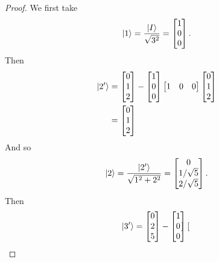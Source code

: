 \begin{proof}
We first take 
\begin{equation*}
    \ket{1} = \frac{\ket{I}}{\sqrt{3^2}} = 
    \begin{bmatrix}
    1 \\
    0 \\
    0
    \end{bmatrix}.
\end{equation*}
Then
\begin{align*}
    \ket{2'} &= 
    \begin{bmatrix}
    0 \\
    1 \\
    2
    \end{bmatrix}
    -
    \begin{bmatrix}
    1 \\
    0 \\
    0
    \end{bmatrix}
    \begin{bmatrix}
    1 & 0 & 0
    \end{bmatrix}
    \begin{bmatrix}
    0 \\
    1 \\
    2
    \end{bmatrix} \\
    &=
    \begin{bmatrix}
    0 \\
    1 \\
    2
    \end{bmatrix}
\end{align*}
And so
\begin{align*}
    \ket{2} = \frac{\ket{2'}}{\sqrt{1^2 + 2^2}} = 
    \begin{bmatrix}
    0 \\
    1/\sqrt{5} \\
    2/\sqrt{5}
    \end{bmatrix}.
\end{align*}
Then
\begin{align*}
    \ket{3'} = 
    \begin{bmatrix}
    0 \\
    2 \\
    5
    \end{bmatrix}
    &-
    \begin{bmatrix}
    1 \\
    0 \\
    0
    \end{bmatrix}
    \begin{bmatrix}

\end{bmatrix}
\end{align*}
\end{proof}
